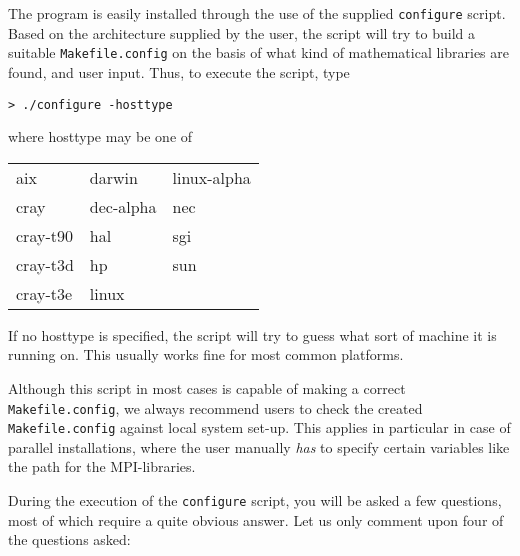 The program is easily installed through the use of the supplied
\verb|configure| script. Based on the
architecture supplied by the user, the
script will try to build a suitable
\verb|Makefile.config| on the
basis of what kind of mathematical libraries are found, and user
input. Thus, to execute the script, type
\begin{verbatim}
> ./configure -hosttype
\end{verbatim}
where hosttype may be one of

\bigskip

\begin{tabular}{lll}
aix \hspace{3cm} & darwin \hspace{3cm} & linux-alpha\\
cray             & dec-alpha             & nec\\
cray-t90         & hal                   & sgi\\
cray-t3d         & hp                    & sun\\
cray-t3e         & linux                 &\\\end{tabular}

\bigskip

If no hosttype is specified, the script will try to guess what sort of
machine it is running on. This usually works fine for most common
platforms.

Although this script in most cases is capable of making a correct
\verb|Makefile.config|, we always recommend users to check the created
\verb|Makefile.config| against local system set-up. This applies in
particular in case of parallel installations, where the user manually
{\em has} to specify certain variables like the path for the
MPI-libraries.

During the execution of the \verb|configure| script, you will be
asked a few questions, most of which require a quite obvious
answer. Let us only comment upon four of the questions asked:

